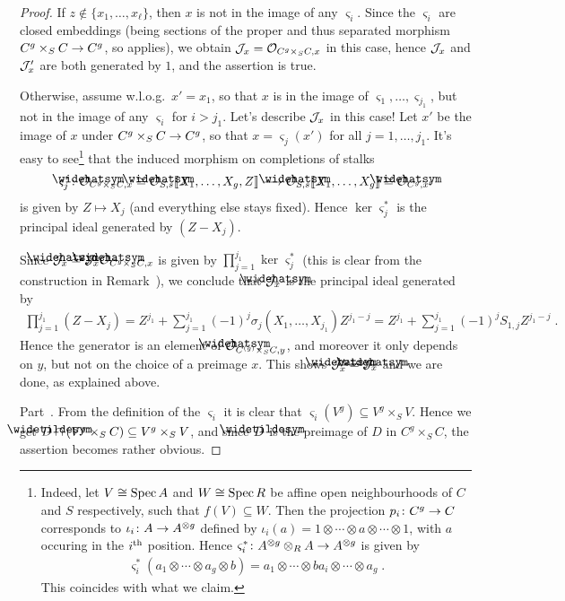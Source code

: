\documentclass[a4paper,parskip=half,numbers=enddot, DIV=12]{scrreprt}
\begin{document}
\begin{proof}
	 If $z\notin\{x_1,\ldots,x_\ell\}$, then $x$ is not in the image of any $\varsigma_i$. Since the $\varsigma_i$ are closed embeddings (being sections of the proper and thus separated morphism $C^g\times_SC\morphism C^g$, so \cite[Proposition~1.5.5]{alggeo1} applies), we obtain $\mathcal{J}_x=\mathcal{O}_{C^g\times_SC,x}$ in this case, hence $\mathcal{J}_x$ and $\mathcal{J}'_x$ are both generated by $1$, and the assertion is true. 
	 
	 Otherwise, assume w.l.o.g.\ $x'=x_1$, so that $x$ is in the image of $\varsigma_1,\ldots,\varsigma_{j_1}$, but not in the image of any $\varsigma_i$ for $i>j_1$. Let's describe $\mathcal{J}_x$ in this case! Let $x'$ be the image of $x$ under $C^g\times_SC\morphism C^g$, so that $x=\varsigma_j(x')$ for all $j=1,\ldots,j_1$. It's easy to see\footnote{Indeed, let $V\cong \operatorname{Spec} A$ and $W\cong \operatorname{Spec} R$ be affine open neighbourhoods of $C$ and $S$ respectively, such that $f(V)\subseteq W$. Then the projection $p_i\colon C^g\morphism C$ corresponds to $\iota_i\colon A\morphism A^{\otimes g}$ defined by $\iota_i(a)=1\otimes\cdots\otimes a\otimes\cdots\otimes 1$, with $a$ occuring in the $i^{\text{th}}$ position. Hence $\varsigma_i^*\colon A^{\otimes g}\otimes_RA\morphism A^{\otimes g}$ is given by
	 \begin{align*}
	 	\varsigma_i^*(a_1\otimes\cdots\otimes a_g\otimes b)=a_1\otimes\cdots\otimes ba_i\otimes\cdots \otimes a_g\;.
	 \end{align*}	
	 This coincides with what we claim.} that the induced morphism on completions of stalks
	 \begin{align*}
	 	\varsigma_j^*\colon \roof{\Oo}_{C^g\times_SC,x}\cong \roof{\Oo}_{S,s}\llbracket X_1,\ldots,X_g,Z\rrbracket\morphism\roof{\Oo}_{S,s}\llbracket X_1,\ldots,X_g\rrbracket\cong \roof{\Oo}_{C^g,x'}
	 \end{align*}
	 is given by $Z\mapsto X_j$ (and everything else stays fixed). Hence $\ker\varsigma_j^*$ is the principal ideal generated by $(Z-X_j)$.
	 
	 Since $\roof{\Jj}_x=\Jj_x\roof{\Oo}_{C^g\times_SC,x}$ is given by $\prod_{j=1}^{j_1}\ker\varsigma_j^*$ (this is clear from the construction in Remark~), we conclude that $\roof{\Jj}_x$ is the principal ideal generated by
	 \begin{align*}
	 	\prod_{j=1}^{j_1}(Z-X_j)=Z^{j_1}+\sum_{j=1}^{j_1}(-1)^j\sigma_j(X_1,\ldots,X_{j_1})Z^{j_1-j}=Z^{j_1}+\sum_{j=1}^{j_1}(-1)^jS_{1,j}Z^{j_1-j}\;.
	 \end{align*}
	 Hence the generator is an element of $\roof{\Oo}_{C^{(g)}\times_SC,y}$, and moreover it only depends on $y$, but not on the choice of a preimage $x$. This shows $\vphantom{\widehat{\Jj}}\roof{\Jj}'_x=\roof{\Jj}_x$ and we are done, as explained above.
	 
	 Part~. From the definition of the $\varsigma_i$ it is clear that $\varsigma_i(V^g)\subseteq V^g\times_SV$. Hence we get $\snake{D}\cap (V^g\times_SC)\subseteq V^g\times_SV$, and since $\snake{D}$ is the preimage of $D$ in $C^g\times_SC$, the assertion becomes rather obvious.
\end{proof}
\end{document}
